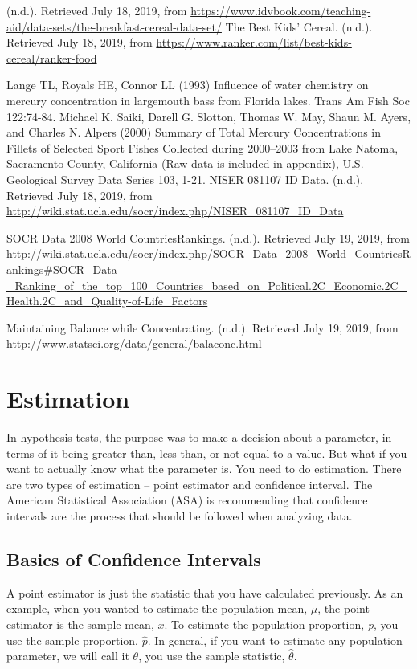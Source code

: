 \documentclass[]{book}
\begin{document}
(n.d.). Retrieved July 18, 2019, from \url{https://www.idvbook.com/teaching-aid/data-sets/the-breakfast-cereal-data-set/}
The Best Kids' Cereal. (n.d.). Retrieved July 18, 2019, from \url{https://www.ranker.com/list/best-kids-cereal/ranker-food}

Lange TL, Royals HE, Connor LL (1993) Influence of water chemistry on mercury concentration in largemouth bass from Florida lakes. Trans Am Fish Soc 122:74-84.
Michael K. Saiki, Darell G. Slotton, Thomas W. May, Shaun M. Ayers, and Charles N. Alpers (2000) Summary of Total Mercury Concentrations in Fillets of Selected Sport Fishes Collected during 2000--2003 from Lake Natoma, Sacramento County, California (Raw data is included in appendix), U.S. Geological Survey Data Series 103, 1-21.
NISER 081107 ID Data. (n.d.). Retrieved July 18, 2019, from \url{http://wiki.stat.ucla.edu/socr/index.php/NISER_081107_ID_Data}

SOCR Data 2008 World CountriesRankings. (n.d.). Retrieved July 19, 2019, from \url{http://wiki.stat.ucla.edu/socr/index.php/SOCR_Data_2008_World_CountriesRankings\#SOCR_Data_-_Ranking_of_the_top_100_Countries_based_on_Political.2C_Economic.2C_Health.2C_and_Quality-of-Life_Factors}

Maintaining Balance while Concentrating. (n.d.). Retrieved July 19, 2019, from \url{http://www.statsci.org/data/general/balaconc.html}

\hypertarget{estimation}{%
\chapter{Estimation}\label{estimation}}

In hypothesis tests, the purpose was to make a decision about a parameter, in terms of it being greater than, less than, or not equal to a value. But what if you want to actually know what the parameter is. You need to do estimation. There are two types of estimation -- point estimator and confidence interval. The American Statistical Association (ASA) is recommending that confidence intervals are the process that should be followed when analyzing data.

\hypertarget{basics-of-confidence-intervals}{%
\section{Basics of Confidence Intervals}\label{basics-of-confidence-intervals}}

A point estimator is just the statistic that you have calculated previously. As an example, when you wanted to estimate the population mean, \(\mu\), the point estimator is the sample mean, \(\bar{x}\). To estimate the population proportion, \emph{p}, you use the sample proportion, \(\hat{p}\). In general, if you want to estimate any population parameter, we will call it \(\theta\), you use the sample statistic, \(\hat{\theta}\).
\end{document}

